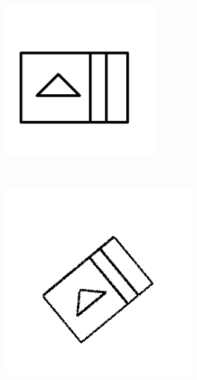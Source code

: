 \begin{figure}[h]
        \centering
                \begin{subfigure}[b]{0.2\textwidth}
                \centering
                \includegraphics[width=0.73\textwidth]{figures/Results/RotationScaling/Model.png}
                \caption{}
        \end{subfigure}\\
                \begin{subfigure}[b]{0.25\textwidth}
                \centering
                \includegraphics[width=0.9\textwidth]{figures/Results/RotationScaling/1.png}

\end{subfigure}
\end{figure}
